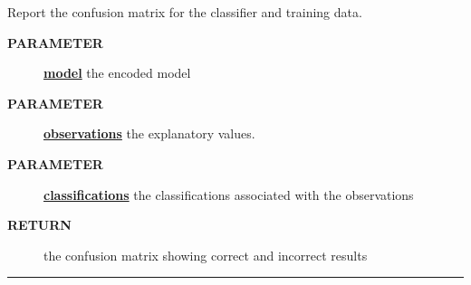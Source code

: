 \par
Report the confusion matrix for the classifier and training data.

\par
\begin{description}
\item [\colorbox{tagtype}{\color{white} \textbf{\textsf{PARAMETER}}}] \textbf{\underline{model}} the encoded model
\item [\colorbox{tagtype}{\color{white} \textbf{\textsf{PARAMETER}}}] \textbf{\underline{observations}} the explanatory values.
\item [\colorbox{tagtype}{\color{white} \textbf{\textsf{PARAMETER}}}] \textbf{\underline{classifications}} the classifications associated with the observations
\item [\colorbox{tagtype}{\color{white} \textbf{\textsf{RETURN}}}] \textbf{\underline{}} the confusion matrix showing correct and incorrect results
\end{description}

\rule{\linewidth}{0.5pt}


